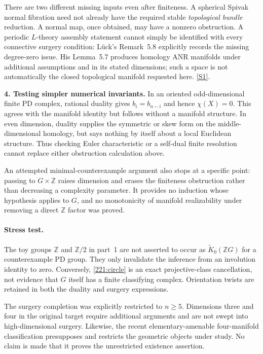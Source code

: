 \documentclass[11pt,a4paper]{article}
\newcommand{\Z}{\mathbb{Z}}
\newcommand{\sref}[2]{\hyperlink{source:#1:#2}{[S#2]}}
\numberwithin{equation}{section}
\begin{document}
There are two different missing inputs even after finiteness. A spherical
Spivak normal fibration need not already have the required stable
\emph{topological bundle} reduction. A normal map, once obtained, may
have a nonzero obstruction. A periodic $L$-theory assembly statement
cannot simply be identified with every connective surgery condition:
L\"uck's Remark~5.8 explicitly records the missing degree-zero issue.
His Lemma~5.7 produces homology ANR manifolds under additional assumptions
and in its stated dimensions; such a space is not automatically the
closed topological manifold requested here. \sref{221}{1}.

\textbf{4. Testing simpler numerical invariants.}
In an oriented odd-dimensional finite PD complex, rational duality gives
$b_i=b_{n-i}$ and hence $\chi(X)=0$. This agrees with the manifold
identity but follows without a manifold structure. In even dimension,
duality supplies the symmetric or skew form on the middle-dimensional
homology, but says nothing by itself about a local Euclidean structure.
Thus checking Euler characteristic or a self-dual finite resolution
cannot replace either obstruction calculation above.

An attempted minimal-counterexample argument also stops at a specific
point: passing to $G\times\Z$ raises dimension and erases the finiteness
obstruction rather than decreasing a complexity parameter. It provides
no induction whose hypothesis applies to $G$, and no monotonicity of
manifold realizability under removing a direct $\Z$ factor was proved.

\paragraph{Stress test.}
The toy groups $\Z$ and $\Z/2$ in part~1 are not asserted to occur as
$\widetilde K_0(\Z G)$ for a counterexample PD group. They only invalidate
the inference from an involution identity to zero. Conversely,
\eqref{221:circle} is an exact projective-class cancellation, not evidence
that $G$ itself has a finite classifying complex. Orientation twists are
retained in both the duality and surgery expressions.

The surgery completion was explicitly restricted to $n\ge5$.
Dimensions three and four in the original target require additional
arguments and are not swept into high-dimensional surgery. Likewise,
the recent elementary-amenable four-manifold classification presupposes
and restricts the geometric objects under study. No claim is made that
it proves the unrestricted existence assertion.
\end{document}
